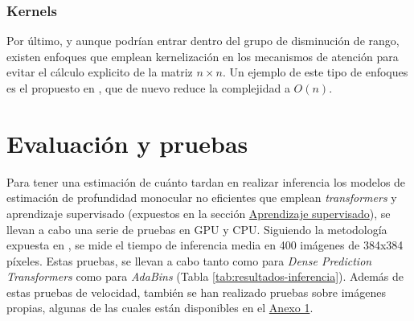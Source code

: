 \documentclass[a4paper]{article}
\begin{document}
\subsubsection{Kernels}
Por último, y aunque podrían entrar dentro del grupo de disminución de rango, existen enfoques que emplean kernelización en los mecanismos de atención para evitar el cálculo explicito de la matriz $n \times n$. Un ejemplo de este tipo de enfoques es el propuesto en \cite{kernel-transformer}, que de nuevo reduce la complejidad a $O(n)$.


\clearpage
\section{Evaluación y pruebas}\label{resultados}

Para tener una estimación de cuánto tardan en realizar inferencia los modelos de estimación de profundidad monocular no eficientes que emplean \textit{transformers} y aprendizaje supervisado (expuestos en la sección \hyperref[aprendizaje-supervisado]{Aprendizaje supervisado}), se llevan a cabo una serie de pruebas en GPU y CPU. Siguiendo la metodología expuesta en \cite{visiontransformersDPT}, se mide el tiempo de inferencia media en 400 imágenes de 384x384 píxeles. Estas pruebas, se llevan a cabo tanto como para \textit{Dense Prediction Transformers} como para \textit{AdaBins} (Tabla \ref{tab:resultados-inferencia}). Además de estas pruebas de velocidad, también se han realizado pruebas sobre imágenes propias, algunas de las cuales están disponibles en el \hyperref[anexo1]{Anexo 1}. 
\end{document}

